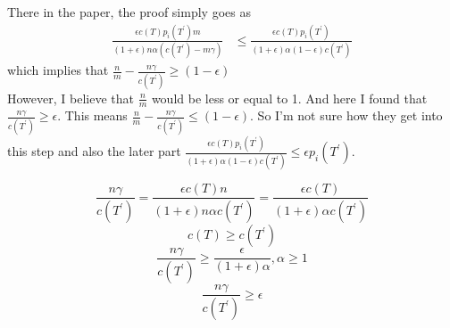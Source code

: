 \documentclass[11pt]{article}
\begin{document}
    There in the paper, the proof simply goes as 
    \begin{align*}
        \frac{\epsilon c(T) p_i(T^{'}) m }{(1+\epsilon)n\alpha(c(T^{'}) - m\gamma)} &\leq \frac{\epsilon c(T) p_i(T^{'})}{(1+\epsilon)\alpha(1-\epsilon)c(T^{'})}
    \end{align*}
    which implies that $\frac{n}{m} - \frac{n\gamma}{c(T^{'})} \geq (1-\epsilon) $\\
    However, I believe that  $\frac{n}{m} $ would be less or equal to 1. And here I found that $\frac{n\gamma}{c(T^{'})} \geq \epsilon$. This means $\frac{n}{m} - \frac{n\gamma}{c(T^{'})} \leq (1-\epsilon) $. So I'm not sure how they get into this step and also the later part $ \frac{\epsilon c(T) p_i(T^{'})}{(1+\epsilon)\alpha(1-\epsilon)c(T^{'})} \leq \epsilon p_i(T^{'})$.

    \[\frac{n\gamma}{c(T^{'})} = \frac{\epsilon c(T) n}{(1+\epsilon)n\alpha c(T^{'})} = \frac{\epsilon c(T) }{(1+\epsilon)\alpha c(T^{'})}\]
    \[c(T) \geq c(T^{'})\]
    \[\frac{n\gamma}{c(T^{'})} \geq \frac{\epsilon}{(1+\epsilon)\alpha},\alpha \ge 1 \]
    \[\frac{n\gamma}{c(T^{'})} \ge \epsilon\]
\end{document}
